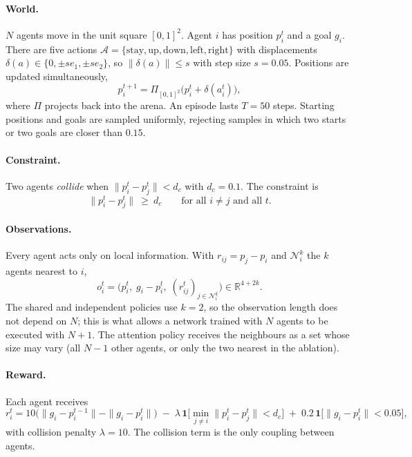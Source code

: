 \paragraph{World.}
$N$ agents move in the unit square $[0,1]^2$. Agent $i$ has position $p_i^t$ and a goal $g_i$. There are five
actions $\mathcal A=\{\text{stay},\text{up},\text{down},\text{left},\text{right}\}$ with displacements
$\delta(a)\in\{0,\pm s e_1,\pm s e_2\}$, so $\|\delta(a)\|\le s$ with step size $s=0.05$. Positions are updated
simultaneously,
\begin{equation}
  p_i^{t+1}=\Pi_{[0,1]^2}\!\big(p_i^t+\delta(a_i^t)\big),
\end{equation}
where $\Pi$ projects back into the arena. An episode lasts $T=50$ steps. Starting positions and goals are
sampled uniformly, rejecting samples in which two starts or two goals are closer than $0.15$.

\paragraph{Constraint.}
Two agents \emph{collide} when $\|p_i^t-p_j^t\|<d_c$ with $d_c=0.1$. The constraint is
\begin{equation}
  \|p_i^t-p_j^t\|\ \ge\ d_c\qquad\text{for all } i\neq j \text{ and all } t.
\end{equation}

\paragraph{Observations.}
Every agent acts only on local information. With $r_{ij}=p_j-p_i$ and $\mathcal N_i^k$ the $k$ agents nearest to $i$,
\begin{equation}
  o_i^t=\big(p_i^t,\; g_i-p_i^t,\; (r_{ij}^t)_{j\in\mathcal N_i^k}\big)\in\mathbb R^{4+2k}.
\end{equation}
The shared and independent policies use $k=2$, so the observation length does not depend on $N$; this is what
allows a network trained with $N$ agents to be executed with $N{+}1$. The attention policy receives the
neighbours as a set whose size may vary (all $N{-}1$ other agents, or only the two nearest in the ablation).

\paragraph{Reward.}
Each agent receives
\begin{equation}
  r_i^t=10\big(\|g_i-p_i^{t-1}\|-\|g_i-p_i^t\|\big)\;-\;\lambda\,\mathbf{1}\!\big[\min_{j\neq i}\|p_i^t-p_j^t\|<d_c\big]\;+\;0.2\,\mathbf{1}\!\big[\|g_i-p_i^t\|<0.05\big],
\end{equation}
with collision penalty $\lambda=10$. The collision term is the only coupling between agents.

